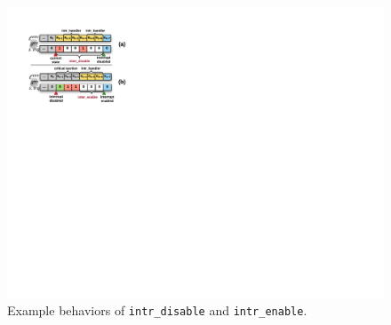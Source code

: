 {\begin{figure}
\begin{center}
	\includegraphics[scale=0.95]{figs/intr_enable}
\end{center}
\caption{Example behaviors of \texttt{intr\_disable} and \texttt{intr\_enable}.}
\label{fig:intr_enable}
\end{figure}
}




